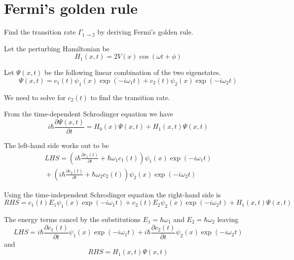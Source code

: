 \documentclass[12pt]{article}
\begin{document}
\section*{Fermi's golden rule}

Find the transition rate $\Gamma_{1\rightarrow2}$
by deriving Fermi's golden rule.

\bigskip

Let the perturbing Hamiltonian be
\begin{equation*}
H_1(x,t)=2V(x)\cos(\omega t+\phi)
\end{equation*}

Let $\Psi(x,t)$ be the following linear combination of the two eigenstates.
\begin{equation*}
\Psi(x,t)=c_1(t)\psi_1(x)\exp(-i\omega_1t)+c_2(t)\psi_2(x)\exp(-i\omega_2t)
\end{equation*}

We need to solve for $c_2(t)$ to find the transition rate.

\bigskip

From the time-dependent Schrodinger equation we have
\begin{equation*}
i\hbar\frac{\partial\Psi(x,t)}{\partial t}=H_0(x)\Psi(x,t)+H_1(x,t)\Psi(x,t)
\end{equation*}

The left-hand side works out to be
\begin{multline*}
LHS=\left(i\hbar\frac{\partial c_1(t)}{\partial t}+\hbar\omega_1c_1(t)\right)
\psi_1(x)\exp(-i\omega_1t)
\\
{}+\left(i\hbar\frac{\partial c_2(t)}{\partial t}+\hbar\omega_2c_2(t)\right)
\psi_2(x)\exp(-i\omega_2t)
\end{multline*}

Using the time-independent Schrodinger equation the right-hand side is
\begin{equation*}
RHS=c_1(t)E_1\psi_1(x)\exp(-i\omega_1t)
+c_2(t)E_2\psi_2(x)\exp(-i\omega_2t)+H_1(x,t)\Psi(x,t)
\end{equation*}

The energy terms cancel by the substitutions
$E_1=\hbar\omega_1$ and $E_2=\hbar\omega_2$ leaving
\begin{equation*}
LHS=i\hbar\frac{\partial c_1(t)}{\partial t}\psi_1(x)\exp(-i\omega_1t)
+i\hbar\frac{\partial c_2(t)}{\partial t}\psi_2(x)\exp(-i\omega_2t)
\end{equation*}
%
and
\begin{equation*}
RHS=H_1(x,t)\Psi(x,t)
\end{equation*}
\end{document}
